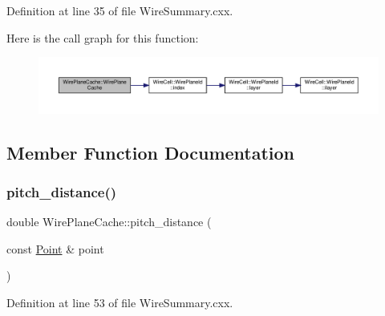 Definition at line 35 of file Wire\+Summary.\+cxx.

Here is the call graph for this function\+:
\nopagebreak
\begin{figure}[H]
\begin{center}
\leavevmode
\includegraphics[width=350pt]{struct_wire_plane_cache_a2cefdea150e8bbd0eb82a2efdca9bbf4_cgraph}
\end{center}
\end{figure}


\subsection{Member Function Documentation}
\mbox{\label{struct_wire_plane_cache_a01c8f094e36bf466517df1b9b4ee071d}} 
\subsubsection{\texorpdfstring{pitch\+\_\+distance()}{pitch\_distance()}}
{\footnotesize\ttfamily double Wire\+Plane\+Cache\+::pitch\+\_\+distance (\begin{DoxyParamCaption}\item[{const \hyperlink{namespace_wire_cell_ab2b2565fa6432efbb4513c14c988cda9}{Point} \&}]{point }\end{DoxyParamCaption})\hspace{0.3cm}{\ttfamily [inline]}}



Definition at line 53 of file Wire\+Summary.\+cxx.


